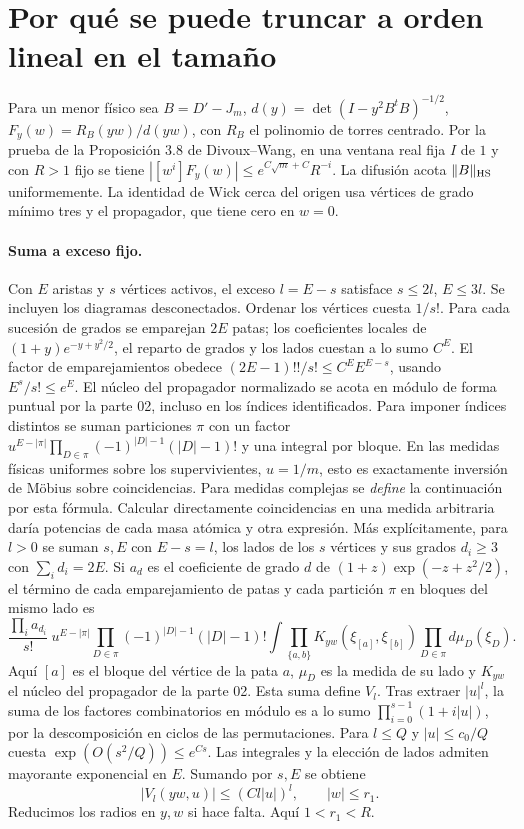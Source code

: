\section{Por qué se puede truncar a orden lineal en el tamaño}
Para un menor físico sea $B=D'-J_m$, $d(y)=\det(I-y^2B^tB)^{-1/2}$,
$F_y(w)=R_B(yw)/d(yw)$, con $R_B$ el polinomio de torres centrado.
Por la prueba de la Proposición 3.8 de Divoux--Wang, en una ventana real fija
$I$ de $1$ y con $R>1$ fijo se tiene $|[w^i]F_y(w)|\le e^{C\sqrt m+C}R^{-i}$.
La difusión acota $\|B\|_{\rm HS}$ uniformemente. La identidad de Wick cerca del
origen usa vértices de grado mínimo tres y el propagador, que tiene cero en $w=0$.
\paragraph{Suma a exceso fijo.}
Con $E$ aristas y $s$ vértices activos, el exceso $l=E-s$ satisface
$s\le2l$, $E\le3l$. Se incluyen los diagramas desconectados. Ordenar los
vértices cuesta $1/s!$. Para cada sucesión de grados se emparejan $2E$ patas;
los coeficientes locales de $(1+y)e^{-y+y^2/2}$, el reparto de grados y los lados
cuestan a lo sumo $C^E$. El factor de emparejamientos obedece
$(2E-1)!!/s!\le C^E E^{E-s}$, usando $E^s/s!\le e^E$.
El núcleo del propagador normalizado se acota en módulo de forma puntual por
la parte 02, incluso en los índices identificados.
Para imponer índices distintos se suman particiones $\pi$ con un factor
$u^{E-|\pi|}\prod_{D\in\pi}(-1)^{|D|-1}(|D|-1)!$ y una integral por bloque.
En las medidas físicas uniformes sobre los supervivientes, $u=1/m$, esto es
exactamente inversión de Möbius sobre coincidencias. Para medidas complejas se
\emph{define} la continuación por esta fórmula. Calcular directamente coincidencias
en una medida arbitraria daría potencias de cada masa atómica y otra expresión.
Más explícitamente, para $l>0$ se suman $s,E$ con $E-s=l$, los lados de los $s$
vértices y sus grados $d_i\ge3$ con $\sum_i d_i=2E$. Si $a_d$ es el coeficiente
de grado $d$ de $(1+z)\exp(-z+z^2/2)$, el término de cada emparejamiento de patas
y cada partición $\pi$ en bloques del mismo lado es
\[
 \frac{\prod_i a_{d_i}}{s!}\ u^{E-|\pi|}
 \prod_{D\in\pi}(-1)^{|D|-1}(|D|-1)!
 \int\prod_{\{a,b\}}K_{yw}(\xi_{[a]},\xi_{[b]})\prod_{D\in\pi}d\mu_D(\xi_D).
\]
Aquí $[a]$ es el bloque del vértice de la pata $a$, $\mu_D$ es la medida de
su lado y $K_{yw}$ el núcleo del propagador de la parte 02. Esta suma define $V_l$.
Tras extraer $|u|^l$, la suma de los factores combinatorios en módulo es a lo sumo
$\prod_{i=0}^{s-1}(1+i|u|)$, por la descomposición en ciclos de las permutaciones.
Para $l\le Q$ y $|u|\le c_0/Q$ cuesta $\exp(O(s^2/Q))\le e^{Cs}$.
Las integrales y la elección de lados admiten mayorante exponencial en $E$.
Sumando por $s,E$ se obtiene
\[
       |V_l(yw,u)|\le (Cl|u|)^l,\qquad |w|\le r_1 .
\]
Reducimos los radios en $y,w$ si hace falta. Aquí $1<r_1<R$.
